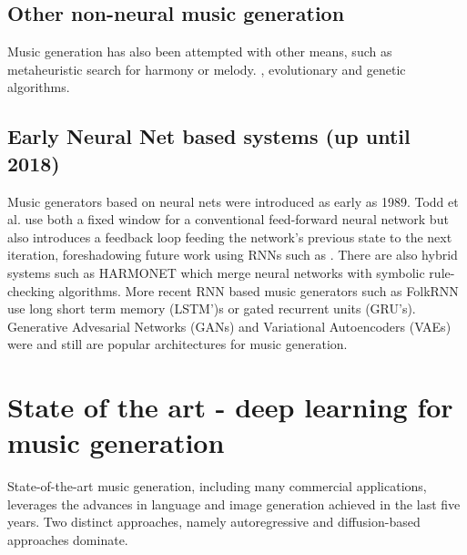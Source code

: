 \subsection{Other non-neural music generation}
Music generation has also been attempted with other means, such as metaheuristic search for harmony or melody. \cite{Altay_Alatas_2018}, evolutionary and genetic algorithms\cite{Polito_Daida_Bersano-Begey_1997}. 


\subsection{Early Neural Net based systems (up until 2018)}

Music generators based on neural nets were introduced as early as 1989. Todd et al. \cite{Todd_1989} use both a fixed window for a conventional feed-forward neural network but also introduces a feedback loop feeding the network's previous state to the next iteration, foreshadowing future work using RNNs such as \cite{Mozer_1994}. There are also hybrid systems such as HARMONET \cite{Hild_Feulner_Menzel_1991} which merge neural networks with symbolic rule-checking algorithms. More recent RNN based music generators such as FolkRNN \cite{Sturm_Ben-Tal_2016} use long short term memory (LSTM’)s or gated recurrent units (GRU’s). Generative Advesarial Networks (GANs) and Variational Autoencoders (VAEs) were and still are popular architectures for music generation. \cite{Civit_Civit-Masot_Cuadrado_Escalona_2022}

\section{State of the art - deep learning for music generation}
State-of-the-art music generation, including many commercial applications, leverages the advances in language and image generation achieved in the last five years. Two distinct approaches, namely autoregressive and diffusion-based approaches dominate.

